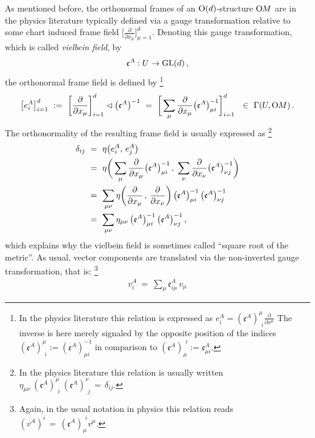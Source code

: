 As mentioned before, the orthonormal frames of an $\operatorname{O}(d)$-structure $\operatorname{O}\mkern-3.6muM$ are in the physics literature typically defined via a gauge transformation relative to some chart induced frame field $\big[ \frac{\partial}{\partial x_\mu} \big]_{\mu=1}^d$.
Denoting this gauge transformation, which is called \emph{vielbein field}, by
\begin{align}
    \mathfrak{e}^A: U \to \operatorname{GL}(d) \,,
\end{align}
the orthonormal frame field is defined by%
\footnote{
    In the physics literature this relation is expressed as
    $e^A_i = (\mathfrak{e}^A)^{\mu}_{\,\ i} \frac{\partial}{\partial x^\mu}$
    The inverse is here merely signaled by the opposite position of the indices
    $(\mathfrak{e}^A)^\mu_{\,\ i} := (\mathfrak{e}^A)^{-1}_{\mu i}$ 
    in comparison to
    $(\mathfrak{e}^A)_\mu^{\,\ i} := \mathfrak{e}^A_{\mu i}$.
}
\begin{align}
    \big[e^A_i\big]_{i=1}^d
    \ :=\ \bigg[ \frac{\partial}{\partial x_\mu} \bigg]_{i=1}^d \lhd \big(\mathfrak{e}^A\big)^{-1}
    \  =\ \bigg[ \sum_\mu \frac{\partial}{\partial x_\mu} \big(\mathfrak{e}^A\big)^{-1}_{\mu i} \bigg]_{i=1}^d
    \ \ \in\ \Gamma(U, \operatorname{O}\mkern-3.6muM) \,.
\end{align}
The orthonormality of the resulting frame field is usually expressed as%
\footnote{
    In the physics literature this relation is usually written
    $\eta_{\mu\nu}\ (\mathfrak{e}^A)^\mu_{\,\ i}\ (\mathfrak{e}^A)^\nu_{\,\ j}\, =\, \delta_{ij}$.
}
\begin{align}
    \delta_{ij}
    \ &=\ \eta\big( e_i^A,\, e_j^A \big) \notag \\
    \ &=\ \eta\bigg( \sum_\mu \frac{\partial}{\partial x_\mu} \big(\mathfrak{e}^A\big)^{-1}_{\mu i}  \,,\; \sum_\nu \frac{\partial}{\partial x_\nu} \big(\mathfrak{e}^A\big)^{-1}_{\nu j} \bigg) \notag \\
    \ &=\ \sum_{\mu\nu} \eta\bigg( \frac{\partial}{\partial x_\mu} \,,\, \frac{\partial}{\partial x_\nu} \bigg)\, \big(\mathfrak{e}^A\big)^{-1}_{\mu i}\, \big(\mathfrak{e}^A\big)^{-1}_{\nu j} \notag \\
    \ &=\ \sum_{\mu\nu} \eta_{\mu\nu}\, \big(\mathfrak{e}^A\big)^{-1}_{\mu i}\, \big(\mathfrak{e}^A\big)^{-1}_{\nu j} \,,
\end{align}
which explains why the vielbein field is sometimes called ``square root of the metric''.
As usual, vector components are translated via the non-inverted gauge transformation, that is:%
\footnote{
    Again, in the usual notation in physics this relation reads $(v^A)^i\, =\, (\mathfrak{e}^A)_\mu^{\,\ i} v^\mu$.
}
\begin{align}
    v^A_i\ =\ \sum_\mu \mathfrak{e}^A_{i\mu}\, v_\mu
\end{align}

